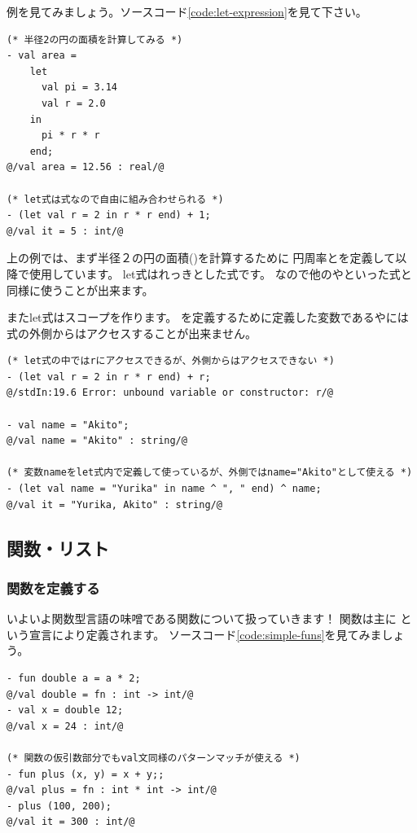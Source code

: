 \documentclass[11pt,a4paper]{jarticle}
\begin{document}
例を見てみましょう。ソースコード\ref{code:let-expression}を見て下さい。

\begin{lstlisting}[caption=let式,label=code:let-expression]
(* 半径2の円の面積を計算してみる *)
- val area =
    let
      val pi = 3.14
      val r = 2.0
    in
      pi * r * r
    end;
@/val area = 12.56 : real/@

(* let式は式なので自由に組み合わせられる *)
- (let val r = 2 in r * r end) + 1;
@/val it = 5 : int/@
\end{lstlisting}

上の例では、まず半径２の円の面積()を計算するために
円周率とを定義して以降で使用しています。
let式はれっきとした式です。
なので他のやといった式と同様に使うことが出来ます。

またlet式はスコープを作ります。
を定義するために定義した変数であるやには
式の外側からはアクセスすることが出来ません。

\begin{lstlisting}[caption=\sml{let}式のスコープ,label=code:let-scope]
(* let式の中ではrにアクセスできるが、外側からはアクセスできない *)
- (let val r = 2 in r * r end) + r;
@/stdIn:19.6 Error: unbound variable or constructor: r/@

- val name = "Akito";
@/val name = "Akito" : string/@

(* 変数nameをlet式内で定義して使っているが、外側ではname="Akito"として使える *)
- (let val name = "Yurika" in name ^ ", " end) ^ name;
@/val it = "Yurika, Akito" : string/@
\end{lstlisting}

\subsection{関数・リスト}
\subsubsection{関数を定義する}
いよいよ関数型言語の味噌である関数について扱っていきます！
関数は主に
という宣言により定義されます。
ソースコード\ref{code:simple-funs}を見てみましょう。

\begin{lstlisting}[caption={単純な関数の定義},label={code:simple-funs}]
- fun double a = a * 2;
@/val double = fn : int -> int/@
- val x = double 12;
@/val x = 24 : int/@

(* 関数の仮引数部分でもval文同様のパターンマッチが使える *)
- fun plus (x, y) = x + y;;
@/val plus = fn : int * int -> int/@
- plus (100, 200);
@/val it = 300 : int/@
\end{lstlisting}
\end{document}
